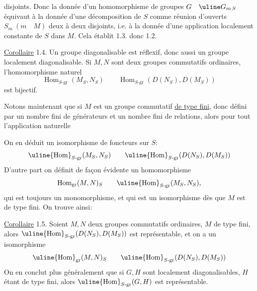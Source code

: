 disjoints. Donc la donnée d'un homomorphisme de groupes
$G\quad\uline G_{m\,S}$
équivaut à la donnée d'une décomposition de $S$ comme réunion d'ouverts
$S_m\ (m\quad M)$ deux à deux disjoints, i.e. à la donnée d'une application
localement constante de $S$ dans $M$. Cela établit 1.3. donc 1.2.

\uline{Corollaire} 1.4. Un groupe diagonalisable est réflexif, donc aussi un
groupe localement diagonalisable. Si $M,N$ sont deux groupes commutatifs
ordinaires,  l'homomorphisme naturel
\[
\operatorname{Hom}_{S\text{-gr}}(M_S,N_S)
\qquad
\operatorname{Hom}_{S\text{-gr}}(D(N_S),D(M_S))
\]
est bijectif.

Notons maintenant que si $M$ est un groupe commutatif \uline{de type fini},
 donc défini par un nombre fini de générateurs et un nombre fini de
relations, alors pour tout
l'application naturelle

On en déduit un isomorphisme de foncteurs sur $S$:
\[
\uline{\operatorname{Hom}}_{S\text{-gr}}(M_S,N_S)
\qquad
\uline{\operatorname{Hom}}_{S\text{-gr}}(D(N_S),D(M_S))
\]
D'autre part on définit de façon évidente un homomorphisme
\[
\operatorname{Hom}_{\mathrm{gr}}(M,N)_S
\qquad
\uline{\operatorname{Hom}}_{S\text{-gr}}(M_S,N_S),
\]
qui est toujours  un monomorphisme, et qui est un isomorphisme dès
que $M$ est de type fini. On trouve ainsi:

\uline{Corollaire} 1.5. 
Soient $M,N$ deux groupes commutatifs
ordinaires, $M$ de type fini, alors 
$\uline{\operatorname{Hom}}_{S\text{-gr}}(D(N_S),D(M_S))$ est
représentable, et on a un isomorphisme
\[
\uline{\operatorname{Hom}}_{\mathrm{gr}}(M,N)_S
\qquad
\uline{\operatorname{Hom}}_{S\text{-gr}}(D(N_S),D(M_S))
\]
On en conclut plus généralement que si $G,H$ sont localement diagonalisables,
$H$ étant de type fini, alors
$\uline{\operatorname{Hom}}_{S\text{-gr}}(G,H)$ est représentable.
